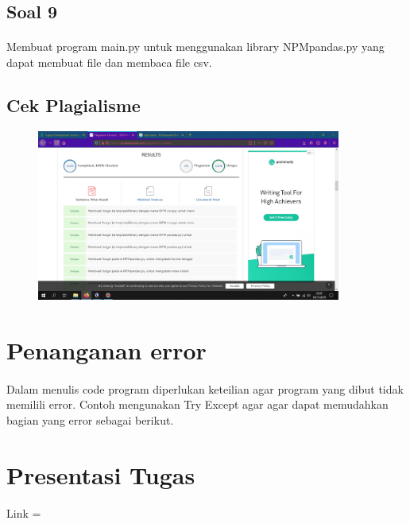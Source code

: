 \documentclass{article}
\begin{document}
    \subsection*{Soal 9}
        \paragraph{}Membuat program main.py untuk menggunakan library NPMpandas.py yang dapat membuat file dan membaca file csv.
        
        
    \subsection{Cek Plagialisme}
        \begin{figure}[ht]
            \centerline{\includegraphics[width=10cm]{Capture3.PNG}}
        \end{figure}
\newpage
\section{Penanganan error}
    \paragraph{}Dalam menulis code program diperlukan keteilian agar program yang dibut tidak memilili error. Contoh mengunakan Try Except agar agar dapat memudahkan bagian yang error sebagai berikut.
    

\section{Presentasi Tugas}
    \paragraph{}Link = 
\end{document}
